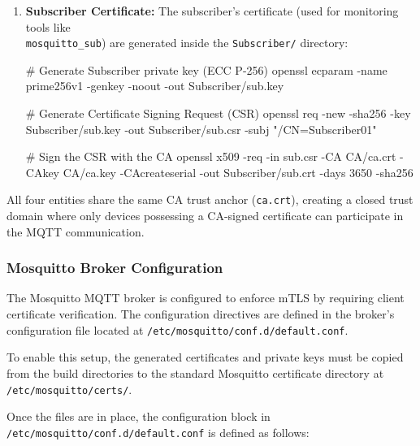 \begin{enumerate}
\begin{bashcode}
# Generate Certificate Signing Request (CSR)
openssl req -new -sha256 -key Client/client.key -out Client/client.csr -subj "/CN=ShellyPlugS"

# Sign the CSR with the CA 
openssl x509 -req -in Client/client.csr -CA CA/ca.crt -CAkey CA/ca.key -CAcreateserial -out Client/client.crt -days 3650 -sha256
\end{bashcode}

    \item \textbf{Subscriber Certificate:} The subscriber's certificate (used for monitoring tools like \\ \texttt{mosquitto\_sub}) are generated inside the \texttt{Subscriber/} directory:

\begin{bashcode}
# Generate Subscriber private key (ECC P-256)
openssl ecparam -name prime256v1 -genkey -noout -out Subscriber/sub.key

# Generate Certificate Signing Request (CSR)
openssl req -new -sha256 -key Subscriber/sub.key -out Subscriber/sub.csr -subj "/CN=Subscriber01"

# Sign the CSR with the CA
openssl x509 -req -in sub.csr -CA CA/ca.crt -CAkey CA/ca.key -CAcreateserial -out Subscriber/sub.crt -days 3650 -sha256
\end{bashcode}

\end{enumerate}

\noindent All four entities share the same CA trust anchor (\texttt{ca.crt}), creating a closed trust domain where only devices possessing a CA-signed certificate can participate in the MQTT communication.


\subsubsection{Mosquitto Broker Configuration}
The Mosquitto MQTT broker is configured to enforce mTLS by requiring client certificate verification. The configuration directives are defined in the broker's configuration file located at \texttt{/etc/mosquitto/conf.d/default.conf}.

\medskip
\noindent To enable this setup, the generated certificates and private keys must be copied from the build directories to the standard Mosquitto certificate directory at \texttt{/etc/mosquitto/certs/}.

\medskip
\noindent Once the files are in place, the configuration block in \texttt{/etc/mosquitto/conf.d/default.conf} is defined as follows:

